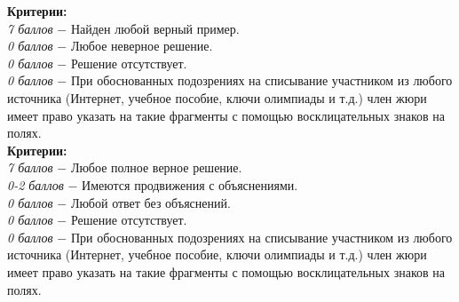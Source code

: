  \textbf{Критерии:} \\
\textit{7 баллов} $-$ Найден любой верный пример.\\
\textit{0 баллов} $-$ Любое неверное решение.\\
\textit{0 баллов} $-$ Решение отсутствует.\\
\textit{0 баллов} $-$ При обоснованных подозрениях на списывание участником из любого источника (Интернет, учебное пособие, ключи олимпиады и т.д.) член жюри имеет право указать на такие фрагменты с помощью восклицательных знаков на полях. \\


 \textbf{Критерии:} \\
\textit{7 баллов} $-$ Любое полное верное решение.\\
\textit{0-2 баллов} $-$ Имеются продвижения с объяснениями.\\
\textit{0 баллов} $-$ Любой ответ без объяснений.\\
\textit{0 баллов} $-$ Решение отсутствует.\\
\textit{0 баллов} $-$ При обоснованных подозрениях на списывание участником из любого источника (Интернет, учебное пособие, ключи олимпиады и т.д.) член жюри имеет право указать на такие фрагменты с помощью восклицательных знаков на полях. \\
